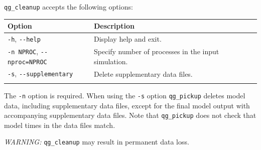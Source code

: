 \documentclass[a4paper]{book}
\begin{document}
\verb+qg_cleanup+ accepts the following options:
\begin{longtable}{ | p{} | p{} | }
  \hline
  Option & Description \\
  \hline
  \endhead
  \verb+-h+, \verb+--help+  & Display help and exit. \\
  \verb+-n NPROC+, \verb+--nproc=NPROC+ & Specify number of processes in the
                                          input simulation. \\
  \verb+-s+, \verb+--supplementary+     & Delete supplementary data files. \\
  \hline
  \endfoot
\end{longtable}
The \verb+-n+ option is required. When using the \verb+-s+ option
\verb+qg_pickup+ deletes model data, including supplementary data files, except
for the final model output with accompanying supplementary data files. Note that
\verb+qg_pickup+ does not check that model times in the data files match.

\emph{WARNING:} \verb+qg_cleanup+ may result in permanent data loss.



\end{document}
